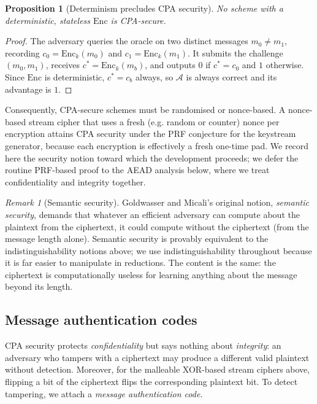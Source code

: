 \documentclass[11pt,a4paper]{article}
\newtheorem{proposition}[theorem]{Proposition}
\theoremstyle{definition}
\theoremstyle{remark}
\newtheorem{remark}[theorem]{Remark}
\begin{document}
\begin{proposition}[Determinism precludes CPA security]\label{symmetric:prp-deterministic}
No scheme with a deterministic, stateless \(\mathrm{Enc}\) is CPA-secure.
\end{proposition}

\begin{proof}
The adversary queries the oracle on two distinct messages \(m_0 \ne m_1\), recording \(c_0 = \mathrm{Enc}_k(m_0)\) and \(c_1 = \mathrm{Enc}_k(m_1)\). It submits the challenge \((m_0, m_1)\), receives \(c^\ast = \mathrm{Enc}_k(m_b)\), and outputs \(0\) if \(c^\ast = c_0\) and \(1\) otherwise. Since \(\mathrm{Enc}\) is deterministic, \(c^\ast = c_b\) always, so \(\mathcal{A}\) is always correct and its advantage is \(1\).
\end{proof}

Consequently, CPA-secure schemes must be randomised or nonce-based. A nonce-based stream cipher that uses a fresh (e.g. random or counter) nonce per encryption attains CPA security under the PRF conjecture for the keystream generator, because each encryption is effectively a fresh one-time pad. We record here the security notion toward which the development proceeds; we defer the routine PRF-based proof to the AEAD analysis below, where we treat confidentiality and integrity together.

\begin{remark}[Semantic security]\label{symmetric:rem-semantic}
Goldwasser and Micali's original notion, \emph{semantic security}, demands that whatever an efficient adversary can compute about the plaintext from the ciphertext, it could compute without the ciphertext (from the message length alone). Semantic security is provably equivalent to the indistinguishability notions above; we use indistinguishability throughout because it is far easier to manipulate in reductions. The content is the same: the ciphertext is computationally useless for learning anything about the message beyond its length.
\end{remark}

\subsection{Message authentication codes}

CPA security protects \emph{confidentiality} but says nothing about \emph{integrity}: an adversary who tampers with a ciphertext may produce a different valid plaintext without detection. Moreover, for the malleable XOR-based stream ciphers above, flipping a bit of the ciphertext flips the corresponding plaintext bit. To detect tampering, we attach a \emph{message authentication code}.
\end{document}
